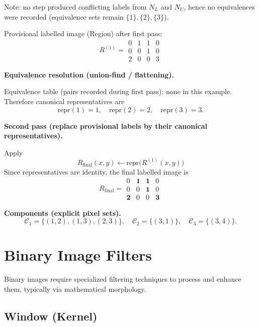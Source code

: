{  \vspace{6pt}
  Note: no step produced conflicting labels from \(N_L\) and \(N_U\), hence no equivalences were recorded (equivalence sets remain \(\{1\},\{2\},\{3\}\)).

Provisional labelled image (Region) after first pass:
\[
R^{(1)}=
\begin{matrix}
0 & 1 & 1 & 0\\
0 & 0 & 1 & 0\\
2 & 0 & 0 & 3
\end{matrix}
\]

\textbf{Equivalence resolution (union-find / flattening).}

Equivalence table (pairs recorded during first pass): none in this example. Therefore canonical representatives are
\[
\mathrm{repr}(1)=1,\quad \mathrm{repr}(2)=2,\quad \mathrm{repr}(3)=3.
\]

\textbf{Second pass (replace provisional labels by their canonical representatives).}

Apply \[R_{\text{final}}(x,y)\leftarrow\mathrm{repr}\big(R^{(1)}(x,y)\big)\]
Since representatives are identity, the final labelled image is
\[
R_{\text{final}}=
\begin{matrix}
0 & \mathbf{1} & \mathbf{1} & 0\\
0 & 0 & \mathbf{1} & 0\\
\mathbf{2} & 0 & 0 & \mathbf{3}
\end{matrix}
\]

\textbf{Components (explicit pixel sets).}
\[
\mathcal{C}_1=\{(1,2),(1,3),(2,3)\},\quad
\mathcal{C}_2=\{(3,1)\},\quad
\mathcal{C}_3=\{(3,4)\}.
\]

}



\section{Binary Image Filters}

Binary images require specialized filtering techniques to process and enhance them, typically via mathematical morphology.

\subsection{Window (Kernel)}

